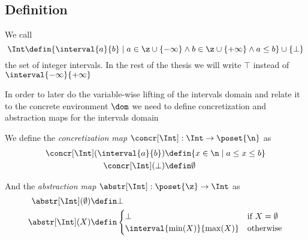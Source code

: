\subsection{Definition}
\label{sub:intervals}


\begin{definition}\label{def:int}
  We call
  \begin{equation*}
    \Int \defin \{ \interval{a}{b} \mid a \in \z \cup \{-\infty\}
    \wedge b \in \z \cup \{+\infty\} \wedge a\leq b \} \cup
    \{\bot\} 
  \end{equation*}
  the set of integer intervals. In the rest of the thesis we will
  write \(\top\) instead of \(\interval{-\infty}{+\infty}\)
\end{definition}

In order to later do the variable-wise lifting of the intervals domain
and relate it to the concrete environment \(\dom\) we need to define
concretization and abstraction maps for the intervals domain

\begin{definition}\label{def:concrint}
  We define the \emph{concretization map} \(\concr[\Int] : \Int \to
  \poset{\n}\) as
  \begin{align*}
    \concr[\Int](\interval{a}{b}) & \defin \{x\in \n \mid a \leq x \leq b\} \\
    \concr[\Int](\bot) & \defin \emptyset
  \end{align*}

  And the \emph{abstraction map} \(\abstr[\Int]:\poset{\z} \to \Int\) as
  \begin{align*}
    \abstr[\Int](\emptyset) & \defin \bot \\
    \abstr[\Int](X) & \defin
    \begin{cases}
      \bot & \text{if } X = \emptyset \\
      \interval{\min(X)}{\max(X)} & \text{otherwise}
    \end{cases}
  \end{align*}
\end{definition}


